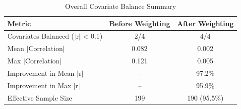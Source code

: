 \begin{table}[htbp]
\centering
\caption{Overall Covariate Balance Summary}
\label{tab:balance_summary}
\begin{tabular}{lcc}
\toprule
Metric & Before Weighting & After Weighting \\
\midrule
Covariates Balanced ($|$r$|$ < 0.1) & 2/4 & 4/4 \\
Mean $|$Correlation$|$ & 0.082 & 0.002 \\
Max $|$Correlation$|$ & 0.121 & 0.005 \\
Improvement in Mean $|$r$|$ & -- & 97.2\% \\
Improvement in Max $|$r$|$ & -- & 95.9\% \\
Effective Sample Size & 199 & 190 (95.5\%) \\
\bottomrule
\end{tabular}
\end{table}
